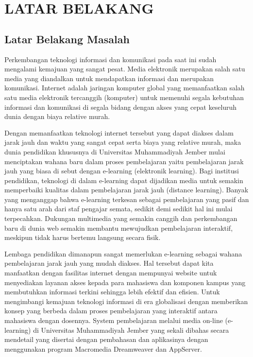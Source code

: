 \documentclass{jtetiproposalskripsi}
\begin{document}
\chapter{LATAR BELAKANG}

\section{Latar Belakang Masalah}
Perkembangan teknologi informasi dan komunikasi pada saat ini sudah mengalami kemajuan yang sangat pesat. Media elektronik merupakan salah satu media yang diandalkan untuk mendapatkan informasi dan merupakan komunikasi. Internet adalah jaringan komputer global yang memanfaatkan salah satu media elektronik tercanggih (komputer) untuk memenuhi segala kebutuhan informasi dan komunikasi di segala bidang dengan akses yang cepat keseluruh dunia dengan biaya relative murah.

Dengan memanfaatkan teknologi internet tersebut yang dapat diakses dalam jarak jauh dan waktu yang sangat cepat serta biaya yang relative murah, maka dunia pendidikan khususnya di Universitas Muhammadiyah Jember mulai menciptakan wahana baru dalam proses pembelajaran yaitu pembelajaran jarak jauh yang biasa di sebut dengan e-learning (elektronik  learning). Bagi institusi pendidikan, teknologi di dalam e-learning dapat dijadikan media untuk semakin memperbaiki kualitas dalam pembelajaran jarak jauh (distance learning). Banyak yang menganggap bahwa e-learning terkesan sebagai pembelajaran yang pasif dan hanya satu arah dari staf pengajar semata, sedikit demi sedikit hal ini mulai terpecahkan. Dukungan multimedia yang semakin canggih dan perkembangan baru di dunia web semakin membantu mewujudkan pembelajaran interaktif, meskipun tidak harus bertemu langsung secara fisik.

Lembaga pendidikan dimanapun sangat memerlukan e-learning sebagai wahana  pembelajaran jarak jauh yang mudah diakses. Hal tersebut dapat kita manfaatkan dengan fasilitas internet dengan mempunyai website untuk menyediakan layanan akses kepada para mahasiswa dan komponen kampus yang membutuhkan informasi terkini sehingga lebih efektif dan efisien.
Untuk mengimbangi kemajuan teknologi informasi di era globalisasi dengan memberikan konsep yang berbeda dalam proses pembelajaran yang interaktif antara mahasiswa dengan dosennya. System pembelajaran melalui media on-line (e-learning) di Universitas Muhammadiyah Jember yang sekali dibahas secara mendetail yang disertai dengan pembahasan dan aplikasinya dengan menggunakan program Macromedia Dreamweaver dan AppServer.
\end{document}
